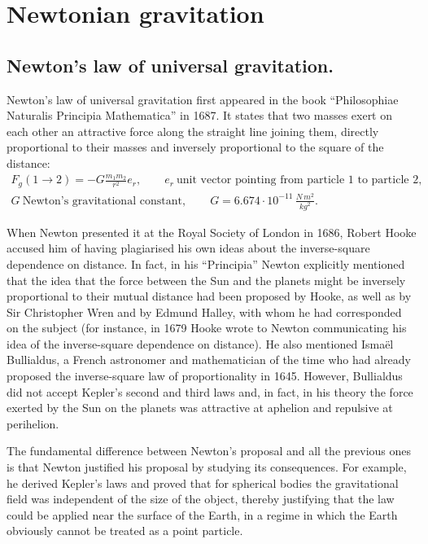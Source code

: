 \chapter{Newtonian gravitation}

\section{Newton's law of universal gravitation.}

\begin{points}
\item Newton's law of universal gravitation first appeared in the book ``Philosophiae Naturalis Principia Mathematica'' in 1687. It states that two masses exert on each other an attractive force along the straight line joining them, directly proportional to their masses and inversely proportional to the square of the distance:
\begin{gather*}
  F_g(1\to2)=-G\frac{m_1m_2}{r^2}e_r,\qquad e_r\ \text{unit vector pointing from particle 1 to particle 2},\\
  G\ \text{Newton's gravitational constant},\qquad G=6.674\cdot10^{-11}\,\frac{N\,m^2}{kg^2}.
\end{gather*}

\item When Newton presented it at the Royal Society of London in 1686, Robert Hooke accused him of having plagiarised his own ideas about the inverse-square dependence on distance. In fact, in his ``Principia'' Newton explicitly mentioned that the idea that the force between the Sun and the planets might be inversely proportional to their mutual distance had been proposed by Hooke, as well as by Sir Christopher Wren and by Edmund Halley, with whom he had corresponded on the subject (for instance, in 1679 Hooke wrote to Newton communicating his idea of the inverse-square dependence on distance). He also mentioned Ismaël Bullialdus, a French astronomer and mathematician of the time who had already proposed the inverse-square law of proportionality in 1645. However, Bullialdus did not accept Kepler's second and third laws and, in fact, in his theory the force exerted by the Sun on the planets was attractive at aphelion and repulsive at perihelion.

\item The fundamental difference between Newton's proposal and all the previous ones is that Newton justified his proposal by studying its consequences. For example, he derived Kepler's laws and proved that for spherical bodies the gravitational field was independent of the size of the object, thereby justifying that the law could be applied near the surface of the Earth, in a regime in which the Earth obviously cannot be treated as a point particle.


\end{points}
